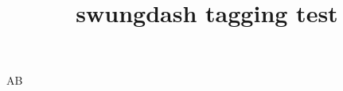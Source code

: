 \documentclass{article}
\title{swungdash tagging test}
\begin{document}
A\swungdash B
\end{document}
